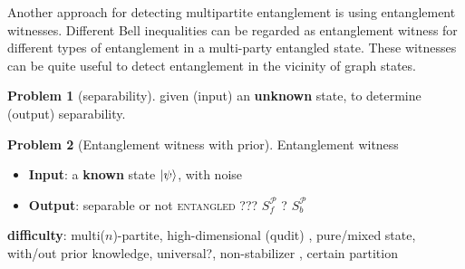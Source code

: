 \documentclass[
10pt,
aps,
pra,
linenumbers,
floatfix,
]{revtex4-2}
\theoremstyle{plain}
\theoremstyle{definition}
\newtheorem{problem}{Problem}
\newcommand{\separable}{S}
\newcommand{\ppartition}{\mathcal{P}}
\begin{document}
Another approach for detecting multipartite entanglement is using entanglement witnesses.
Different Bell inequalities can be regarded as entanglement witness for different types of entanglement in a multi-party entangled state.
These witnesses can be quite useful to detect entanglement in the vicinity of graph states.
\begin{problem}[separability]\label{prm:separable}
	given (input) an \textbf{unknown} state, to determine (output) separability.
\end{problem}
\begin{problem}[Entanglement witness with prior]
	Entanglement witness	
		\begin{itemize}
		\item \textbf{Input}: a \textbf{known} state $\ket{\psi}$, with noise
		\item \textbf{Output}: \textsf{separable} or not \textsc{entangled} ??? $\separable_f^\ppartition$ ? $\separable_b^\ppartition$ 
	\end{itemize}
	\textbf{difficulty}: multi($n$)-partite, high-dimensional (qudit) \cite{sciaraUniversalPartiteLevel2019}, pure/mixed state, with/out prior knowledge, universal?, non-stabilizer \cite{tothEntanglementDetectionStabilizer2005}, certain partition
\end{problem}
\end{document}
